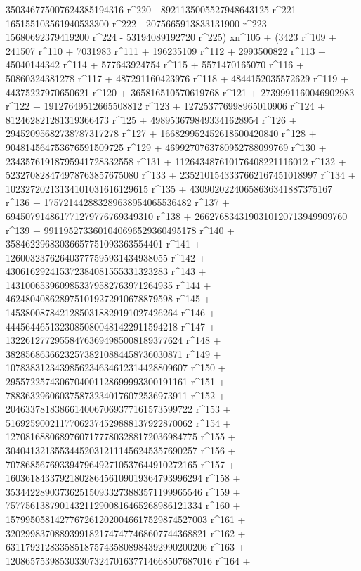        350346775007624385194316 r^220 - 
       8921135005527948643125 r^221 - 165155103561940533300 r^222 - 
       2075665913833131900 r^223 - 15680692379419200 r^224 - 
       53194089192720 r^225) xn^105 + (3423 r^109 + 241507 r^110 + 
       7031983 r^111 + 196235109 r^112 + 2993500822 r^113 + 
       45040144342 r^114 + 577643924754 r^115 + 5571470165070 r^116 + 
       50860324381278 r^117 + 487291160423976 r^118 + 
       4844152035572629 r^119 + 44375227970650621 r^120 + 
       365816510570619768 r^121 + 2739991160046902983 r^122 + 
       19127649512665508812 r^123 + 127253776998965010906 r^124 + 
       812462821281319366473 r^125 + 4989536798493341628954 r^126 + 
       29452095682738787317278 r^127 + 
       166829952452618500420840 r^128 + 
       904814564753676591509725 r^129 + 
       4699270763780952788099769 r^130 + 
       23435761918795941728332558 r^131 + 
       112643487610176408221116012 r^132 + 
       523270828474978763857675080 r^133 + 
       2352101543337662167451018997 r^134 + 
       10232720213134101031616129615 r^135 + 
       43090202240658636341887375167 r^136 + 
       175721442883289638954065536482 r^137 + 
       694507914861771279776769349310 r^138 + 
       2662768343190310120713949909760 r^139 + 
       9911952733601040696529360495178 r^140 + 
       35846229683036657751093363554401 r^141 + 
       126003237626403777595931434938055 r^142 + 
       430616292415372384081555331323283 r^143 + 
       1431006539609853379582763971264935 r^144 + 
       4624804086289751019272910678879598 r^145 + 
       14538008784212850318829191027426264 r^146 + 
       44456446513230850800481422911594218 r^147 + 
       132261277295584763694985008189377624 r^148 + 
       382856863662325738210884458736030871 r^149 + 
       1078383123439856234634612314428809607 r^150 + 
       2955722574306704001128699993300191161 r^151 + 
       7883632960603758732340176072536973911 r^152 + 
       20463378183866140067069377161573599722 r^153 + 
       51692590021177062374529888137922870062 r^154 + 
       127081688068976071777803288172036984775 r^155 + 
       304041321355344520312111456245357690257 r^156 + 
       707868567693394796492710537644910272165 r^157 + 
       1603618433792180286456109019364793996294 r^158 + 
       3534422890373625150933273883571199965546 r^159 + 
       7577561387901432112900816465268986121334 r^160 + 
       15799505814277672612020046617529874527003 r^161 + 
       32029983708893991821747477468607744368821 r^162 + 
       63117921283358518757435808984392990200206 r^163 + 
       120865753985303307324701637714668507687016 r^164 + 
